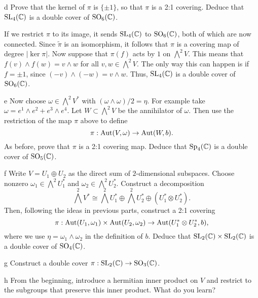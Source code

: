 \documentclass{pset}
\begin{document}
\begin{solution}
  \begin{part}{d}
    Prove that the kernel of $\pi$ is $\{\pm 1\}$, so that $\pi$ is a 2:1 covering. Deduce that $\mathrm{SL}_4(\mathbb{C})$ is a double cover of $\mathrm{SO}_6(\mathbb{C})$.
  \end{part}

  If we restrict $\pi$ to its image, it sends $\mathrm{SL}_4(\mathbb{C})$ to $\mathrm{SO}_6(\mathbb{C})$, both of which are now connected. Since $\widetilde{\pi}$ is an isomorphism, it follows that $\pi$ is a covering map of degree $|\ker \pi|$. Now suppose that $\pi(f)$ acts by $1$ on $\bigwedge^2 V$. This means that $f(v)\wedge f(w) = v\wedge w$ for all $v,w\in \bigwedge^2 V$. The only way this can happen is if $f=\pm 1$, since $(-v)\wedge (-w)=v\wedge w$. Thus, $\mathrm{SL}_4(\mathbb{C})$ is a double cover of $\mathrm{SO}_6(\mathbb{C})$.

  \begin{part}{e}
    Now choose $\omega\in \bigwedge^2 V^*$ with $(\omega\wedge \omega)/2 = \eta$. For example take $\omega=e^1\wedge e^2 + e^3\wedge e^4$. Let $W\subset \bigwedge^2 V$ be the annihilator of $\omega$. Then use the restriction of the map $\pi$ above to define
    \[
      \pi : \textrm{Aut}(V, \omega) \to \textrm{Aut}(W, b).
    \]
    As before, prove that $\pi$ is a 2:1 covering map. Deduce that $\mathrm{Sp}_4(\mathbb{C})$ is a double cover of $\mathrm{SO}_5(\mathbb{C})$.
  \end{part}

  \begin{part}{f}
    Write $V=U_1\oplus U_2$ as the direct sum of $2$-dimensional subspaces. Choose nonzero $\omega_1\in \bigwedge^2 U^*_1$ and $\omega_2\in \bigwedge^2 U^*_2$. Construct a decomposition \[\bigwedge^2 V^* \cong \bigwedge^2 U^*_1\oplus \bigwedge^2 U_2^*\oplus (U_1^*\otimes U_2^*).\]
    Then, following the ideas in previous parts, construct a 2:1 covering
    \[
    \pi : \textrm{Aut}(U_1, \omega_1)\times \textrm{Aut}(U_2,\omega_2) \to \textrm{Aut}(U_1^*\otimes U_2^*, b),
    \]
    where we use $\eta = \omega_1\wedge \omega_2$ in the definition of $b$. Deduce that $\mathrm{SL}_2(\mathbb{C})\times \mathrm{SL}_2(\mathbb{C})$ is a double cover of $\mathrm{SO}_4(\mathbb{C})$.
  \end{part}


  \begin{part}{g}
    Construct a double cover $\pi : \mathrm{SL}_2(\mathbb{C}) \to \mathrm{SO}_3(\mathbb{C})$.
  \end{part}

  \begin{part}{h}
    From the beginning, introduce a hermitian inner product on $V$ and restrict to the subgroups that preserve this inner product. What do you learn?
  \end{part}
\end{solution}
\end{document}

